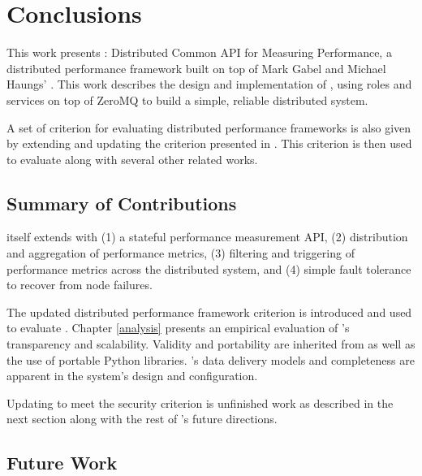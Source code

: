 \chapter{Conclusions}
\label{conclusions}

This work presents \dcampns: Distributed Common API for Measuring Performance, a distributed performance framework built
on top of Mark Gabel and Michael Haungs' \camp \cite{gabel2007}. This work describes the design and implementation of
\dcampns, using roles and services on top of ZeroMQ to build a simple, reliable distributed system.

A set of criterion for evaluating distributed performance frameworks is also given by extending and updating the
criterion presented in \cite{zanikolas2005}. This criterion is then used to evaluate \dcamp along with several other
related works.

\section{Summary of Contributions}

\dcamp itself extends \camp with (1) a stateful performance measurement API, (2) distribution and aggregation of
performance metrics, (3) filtering and triggering of performance metrics across the distributed system, and (4) simple
fault tolerance to recover from node failures.

The updated distributed performance framework criterion is introduced and used to evaluate \dcampns. Chapter
\ref{analysis} presents an empirical evaluation of \dcampns's transparency and scalability. Validity and portability are
inherited from \camp as well as the use of portable Python libraries. \dcampns's data delivery models and completeness
are apparent in the system's design and configuration.

Updating \dcamp to meet the security criterion is unfinished work as described in the next section along with the rest
of \dcampns's future directions.

\section{Future Work}
\label{future_work}

